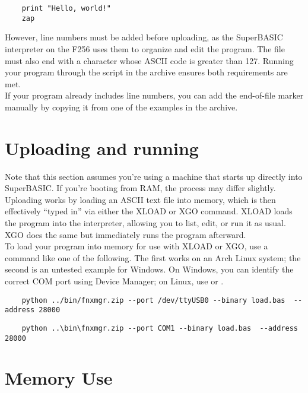 \begin{verbatim}
	print "Hello, world!"
	zap
\end{verbatim}

However, line numbers must be added before uploading, as the SuperBASIC interpreter on the F256 uses them to organize and edit the program. The file must also end with a character whose ASCII code is greater than 127. Running your program through the  script in the  archive ensures both requirements are met.\\

If your program already includes line numbers, you can add the end-of-file marker manually by copying it from one of the examples in the archive.

\section{Uploading and running}

Note that this section assumes you're using a machine that starts up directly into SuperBASIC. If you're booting from RAM, the process may differ slightly.\\

Uploading works by loading an ASCII text file into memory, which is then effectively “typed in” via either the XLOAD or XGO command. XLOAD loads the program into the interpreter, allowing you to list, edit, or run it as usual. XGO does the same but immediately runs the program afterward.\\

To load your program into memory for use with XLOAD or XGO, use a command like one of the following. The first works on an Arch Linux system; the second is an untested example for Windows. On Windows, you can identify the correct COM port using Device Manager; on Linux, use  or .

\begin{verbatim}
	python ../bin/fnxmgr.zip --port /dev/ttyUSB0 --binary load.bas  --address 28000
\end{verbatim}

\begin{verbatim}
	python ..\bin\fnxmgr.zip --port COM1 --binary load.bas  --address 28000
\end{verbatim}

\section{Memory Use}

